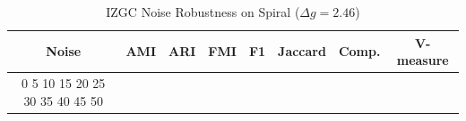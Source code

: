 \begin{table}[htbp]
\centering
\caption{IZGC Noise Robustness on Spiral ($\Delta g=2.46$)}
\label{tab:noise_spiral_izgc}
\begin{tabular}{cccccccc}
\toprule
Noise & AMI & ARI & FMI & F1 & Jaccard & Comp. & V-measure \\
\midrule
0%
5%
10%
15%
20%
25%
30%
35%
40%
45%
50%
\bottomrule
\end{tabular}
\end{table}